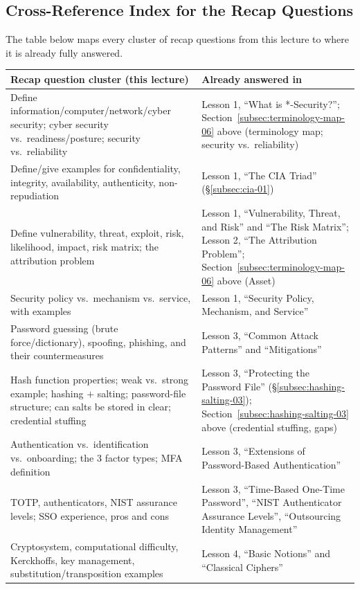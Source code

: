 \documentclass[12pt, a4paper]{article}
\begin{document}
\subsection{Cross-Reference Index for the Recap Questions}
The table below maps every cluster of recap questions from this lecture to where it is already fully answered.

\begin{center}
\small
\begin{tabular}{@{}p{6.7cm}p{6.7cm}@{}}
\toprule
\textbf{Recap question cluster (this lecture)} & \textbf{Already answered in} \\
\midrule
Define information/computer/network/cyber security; cyber security vs.\ readiness/posture; security vs.\ reliability & Lesson 1, ``What is *-Security?''; Section~\ref{subsec:terminology-map-06} above (terminology map; security vs.\ reliability) \\
Define/give examples for confidentiality, integrity, availability, authenticity, non-repudiation & Lesson 1, ``The CIA Triad'' (\S\ref{subsec:cia-01}) \\
Define vulnerability, threat, exploit, risk, likelihood, impact, risk matrix; the attribution problem & Lesson 1, ``Vulnerability, Threat, and Risk'' and ``The Risk Matrix''; Lesson 2, ``The Attribution Problem''; Section~\ref{subsec:terminology-map-06} above (Asset) \\
Security policy vs.\ mechanism vs.\ service, with examples & Lesson 1, ``Security Policy, Mechanism, and Service'' \\
Password guessing (brute force/dictionary), spoofing, phishing, and their countermeasures & Lesson 3, ``Common Attack Patterns'' and ``Mitigations'' \\
Hash function properties; weak vs.\ strong example; hashing $+$ salting; password-file structure; can salts be stored in clear; credential stuffing & Lesson 3, ``Protecting the Password File'' (\S\ref{subsec:hashing-salting-03}); Section~\ref{subsec:hashing-salting-03} above (credential stuffing, gaps) \\
Authentication vs.\ identification vs.\ onboarding; the 3 factor types; MFA definition & Lesson 3, ``Extensions of Password-Based Authentication'' \\
TOTP, authenticators, NIST assurance levels; SSO experience, pros and cons & Lesson 3, ``Time-Based One-Time Password'', ``NIST Authenticator Assurance Levels'', ``Outsourcing Identity Management'' \\
Cryptosystem, computational difficulty, Kerckhoffs, key management, substitution/transposition examples & Lesson 4, ``Basic Notions'' and ``Classical Ciphers'' \\

\end{tabular}
\end{center}
\end{document}
